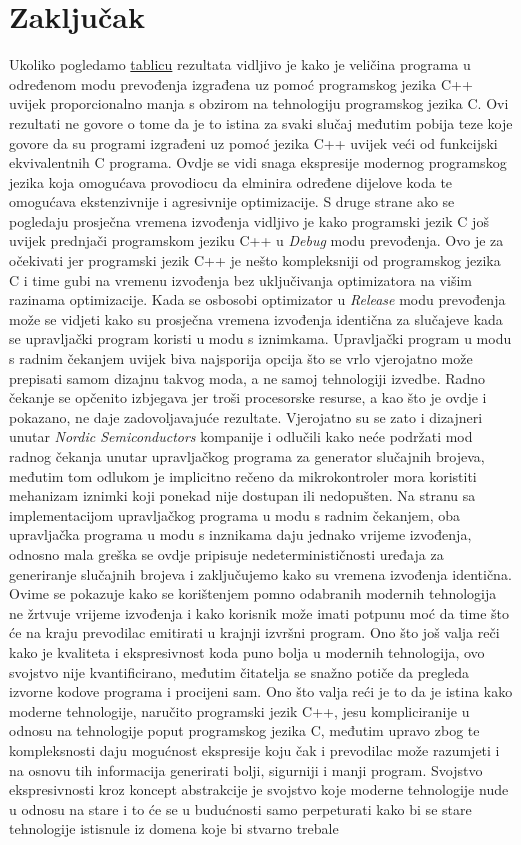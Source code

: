 \chapter{Zaključak}
Ukoliko pogledamo \hyperref[table:results]{tablicu} rezultata vidljivo je kako je veličina programa u određenom modu prevođenja izgrađena uz pomoć programskog jezika C++ uvijek proporcionalno manja s obzirom na tehnologiju programskog jezika C. Ovi rezultati ne govore o tome da je to istina za svaki slučaj međutim pobija teze koje govore da su programi izgrađeni uz pomoć jezika C++ uvijek veći od funkcijski ekvivalentnih C programa. Ovdje se vidi snaga ekspresije modernog programskog jezika koja omogućava provodiocu da elminira određene dijelove koda te omogućava ekstenzivnije i agresivnije optimizacije. S druge strane ako se pogledaju prosječna vremena izvođenja vidljivo je kako programski jezik C još uvijek prednjači programskom jeziku C++ u \textit{Debug} modu prevođenja. Ovo je za očekivati jer programski jezik C++ je nešto kompleksniji od programskog jezika C i time gubi na vremenu izvođenja bez uključivanja optimizatora na višim razinama optimizacije. Kada se osbosobi optimizator u \textit{Release} modu prevođenja može se vidjeti kako su prosječna vremena izvođenja identična za slučajeve kada se upravljački program koristi u modu s iznimkama. Upravljački program u modu s radnim čekanjem uvijek biva najsporija opcija što se vrlo vjerojatno može prepisati samom dizajnu takvog moda, a ne samoj tehnologiji izvedbe. Radno čekanje se opčenito izbjegava jer troši procesorske resurse, a kao što je ovdje i pokazano, ne daje zadovoljavajuće rezultate. Vjerojatno su se zato i dizajneri unutar \textit{Nordic Semiconductors} kompanije i odlučili kako neće podržati mod radnog čekanja unutar upravljačkog programa za generator slučajnih brojeva, međutim tom odlukom je implicitno rečeno da mikrokontroler mora koristiti mehanizam iznimki koji ponekad nije dostupan ili nedopušten. Na stranu sa implementacijom upravljačkog programa u modu s radnim čekanjem, oba upravljačka programa u modu s inznikama daju jednako vrijeme izvođenja, odnosno mala greška se ovdje pripisuje nedeterminističnosti uređaja za generiranje slučajnih brojeva i zaključujemo kako su vremena izvođenja identična. Ovime se pokazuje kako se korištenjem pomno odabranih modernih tehnologija ne žrtvuje vrijeme izvođenja i kako korisnik može imati potpunu moć da time što će na kraju prevodilac emitirati u krajnji izvršni program. Ono što još valja reči kako je kvaliteta i ekspresivnost koda puno bolja u modernih tehnologija, ovo svojstvo nije kvantificirano, međutim čitatelja se snažno potiče da pregleda izvorne kodove programa i procijeni sam. Ono što valja reći je to da je istina kako moderne tehnologije, naručito programski jezik C++, jesu kompliciranije u odnosu na tehnologije poput programskog jezika C, međutim upravo zbog te kompleksnosti daju mogućnost ekspresije koju čak i prevodilac može razumjeti i na osnovu tih informacija generirati bolji, sigurniji i manji program. Svojstvo ekspresivnosti kroz koncept abstrakcije je svojstvo koje moderne tehnologije nude u odnosu na stare i to će se u budućnosti samo perpeturati kako bi se stare tehnologije istisnule iz domena koje bi stvarno trebale 